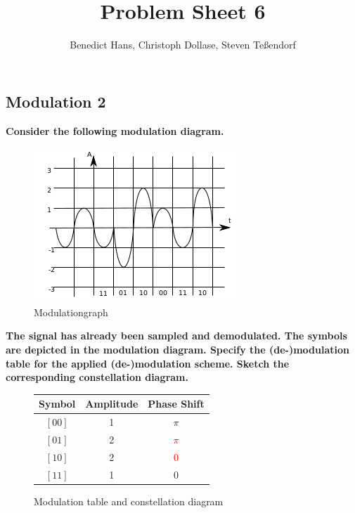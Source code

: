 \documentclass[a4paper,12pt]{article}
\author{Benedict Hans, Christoph Dollase, Steven Te\ss endorf}
\title{ \textbf{Problem Sheet 6}}
\begin{document}
	 
	\maketitle	 %
	
	\subsection{Modulation 2}
	\textbf{Consider the following modulation diagram.}
    
	\begin{figure}[h!]
		\includegraphics[width=0.4\linewidth]{modulation.png} 
    	\caption{Modulationgraph}
	\end{figure}
    
    \textbf{The signal has already been sampled and demodulated. The symbols are depicted in the 
	modulation diagram. Specify the (de-)modulation table for the applied (de-)modulation scheme.
	Sketch the corresponding constellation diagram.}


\begin{figure}[h!]
	\begin{minipage}{0.48\linewidth}
			\begin{tabular}{|c|c|c|}\hline
				\textbf{Symbol} & \textbf{Amplitude} & \textbf{Phase Shift} \\ \hline
				$[00]$ & 1 & $\pi$ \\
				$[01]$ & 2 & \textcolor{red}{$\pi$} \\
				$[10]$ & 2 & \textcolor{red}{0} \\
				$[11]$ & 1 & 0 \\ \hline
			\end{tabular}
	\end{minipage}
	\hfill
	\begin{minipage}{0.48\linewidth}
	\end{minipage}
	\caption{Modulation table and constellation diagram}
\end{figure}
\end{document}
